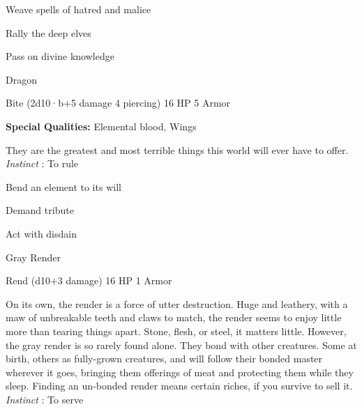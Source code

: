 \startitemize[1,packed]
         
\item Weave spells of hatred and malice

         
\item Rally the deep elves

         
\item Pass on divine knowledge

       
\stopitemize
       
\startMonsterName
Dragon	 
\stopMonsterName
       

Bite (2d10·b+5 damage 4 piercing)	16 HP	5 Armor

       


       
\startMonsterQualities
         {\bf Special Qualities:}  Elemental blood, Wings
\stopMonsterQualities
       
\startMonsterDescription
They are the greatest and most terrible things this world will ever have to offer. {\em Instinct} : To rule
\stopMonsterDescription
       
\startitemize[1,packed]
         
\item Bend an element to its will

         
\item Demand tribute

         
\item Act with disdain

       
\stopitemize
       
\startMonsterName
Gray Render	 
\stopMonsterName
       

Rend (d10+3 damage)	16 HP	1 Armor

       


       
\startMonsterDescription
On its own, the render is a force of utter destruction. Huge and leathery, with a maw of unbreakable teeth and claws to match, the render seems to enjoy little more than tearing things apart. Stone, flesh, or steel, it matters little. However, the gray render is so rarely found alone. They bond with other creatures. Some at birth, others as fully-grown creatures, and will follow their bonded master wherever it goes, bringing them offerings of meat and protecting them while they sleep. Finding an un-bonded render means certain riches, if you survive to sell it. {\em Instinct} : To serve
\stopMonsterDescription
       
